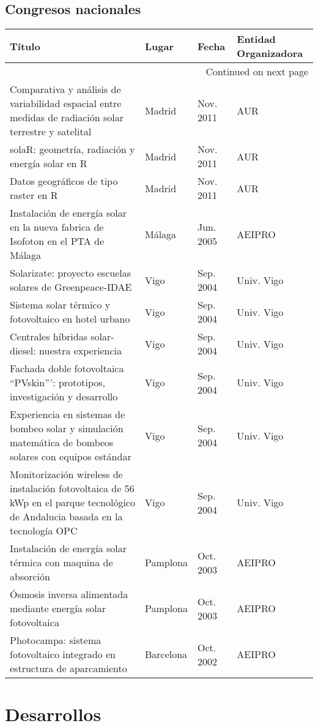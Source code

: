 \documentclass[article, a4paper]{memoir}
\begin{document}
\subsection{Congresos nacionales}
\label{sec-6-2}
\begin{longtable}{p{87mm}|p{30mm}|p{15mm}|p{30mm}}
Título & Lugar & Fecha & Entidad Organizadora\\
\hline
\endhead
\hline\multicolumn{4}{r}{Continued on next page} \\
\endfoot
\endlastfoot
Comparativa y análisis de variabilidad espacial entre medidas de radiación solar terrestre y satelital & Madrid & Nov. 2011 & AUR\\
solaR: geometría, radiación y energía solar en R & Madrid & Nov. 2011 & AUR\\
Datos geográficos de tipo raster en R & Madrid & Nov. 2011 & AUR\\
Instalación de energía solar en la nueva fabrica de Isofoton en el PTA de Málaga & Málaga & Jun. 2005 & AEIPRO\\
Solarizate: proyecto escuelas solares de Greenpeace-IDAE & Vigo & Sep. 2004 & Univ. Vigo\\
Sistema solar térmico y fotovoltaico en hotel urbano & Vigo & Sep. 2004 & Univ. Vigo\\
Centrales híbridas solar-diesel: nuestra experiencia & Vigo & Sep. 2004 & Univ. Vigo\\
Fachada doble fotovoltaica ``PVskin''': prototipos, investigación y desarrollo & Vigo & Sep. 2004 & Univ. Vigo\\
Experiencia en sistemas de bombeo solar y simulación matemática de bombeos solares con equipos estándar & Vigo & Sep. 2004 & Univ. Vigo\\
Monitorización wireless de instalación fotovoltaica de 56 kWp en el parque tecnológico de Andalucia basada en la tecnología OPC & Vigo & Sep. 2004 & Univ. Vigo\\
Instalación de energía solar térmica con maquina de absorción & Pamplona & Oct. 2003 & AEIPRO\\
Ósmosis inversa alimentada mediante energía solar fotovoltaica & Pamplona & Oct. 2003 & AEIPRO\\
Photocampa: sistema fotovoltaico integrado en estructura de aparcamiento & Barcelona & Oct. 2002 & AEIPRO\\
\end{longtable}


\section{Desarrollos}
\label{sec-7}
\end{document}
